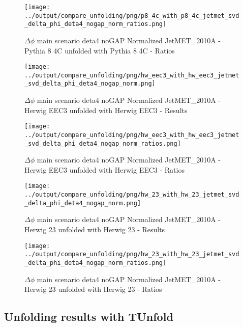 \documentclass[11pt]{book}
\begin{document}
\begin{figure}[ht]
\centering
\texttt{[image: ../output/compare\_unfolding/png/p8\_4c\_with\_p8\_4c\_jetmet\_svd\_delta\_phi\_deta4\_nogap\_norm\_ratios.png]}
\caption{$\Delta\phi$ main scenario deta4 noGAP Normalized JetMET\_2010A - Pythia 8 4C unfolded with Pythia 8 4C - Ratios}
\label{p8_p8_jetmet_svd_delta_phi_deta4_nogap_norm_b}
\end{figure}

\begin{figure}[ht]
\centering
\texttt{[image: ../output/compare\_unfolding/png/hw\_eec3\_with\_hw\_eec3\_jetmet\_svd\_delta\_phi\_deta4\_nogap\_norm.png]}
\caption{$\Delta\phi$ main scenario deta4 noGAP Normalized JetMET\_2010A - Herwig EEC3 unfolded with Herwig EEC3 - Results}
\label{hw_eec3_hw_eec3_jetmet_svd_delta_phi_deta4_nogap_norm_a}
\end{figure}

\begin{figure}[ht]
\centering
\texttt{[image: ../output/compare\_unfolding/png/hw\_eec3\_with\_hw\_eec3\_jetmet\_svd\_delta\_phi\_deta4\_nogap\_norm\_ratios.png]}
\caption{$\Delta\phi$ main scenario deta4 noGAP Normalized JetMET\_2010A - Herwig EEC3 unfolded with Herwig EEC3 - Ratios}
\label{hw_eec3_hw_eec3_jetmet_svd_delta_phi_deta4_nogap_norm_b}
\end{figure}

\begin{figure}[ht]
\centering
\texttt{[image: ../output/compare\_unfolding/png/hw\_23\_with\_hw\_23\_jetmet\_svd\_delta\_phi\_deta4\_nogap\_norm.png]}
\caption{$\Delta\phi$ main scenario deta4 noGAP Normalized JetMET\_2010A - Herwig 23 unfolded with Herwig 23 - Results}
\label{hw_23_hw_23_jetmet_svd_delta_phi_deta4_nogap_norm_a}
\end{figure}

\begin{figure}[ht]
\centering
\texttt{[image: ../output/compare\_unfolding/png/hw\_23\_with\_hw\_23\_jetmet\_svd\_delta\_phi\_deta4\_nogap\_norm\_ratios.png]}
\caption{$\Delta\phi$ main scenario deta4 noGAP Normalized JetMET\_2010A - Herwig 23 unfolded with Herwig 23 - Ratios}
\label{hw_23_hw_23_jetmet_svd_delta_phi_deta4_nogap_norm_b}
\end{figure}


\clearpage
\subsection{Unfolding results with TUnfold}
\end{document}
